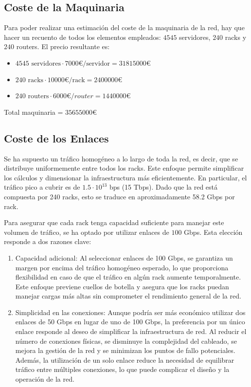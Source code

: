 \documentclass[%
    school=etsisi,%
    degree=61TI,%
]{upm-report}
\begin{document}
\subsection{Coste de la Maquinaria}
\label{subsec:coste-maquinaria}

Para poder realizar una estimación del coste de la maquinaria de la red, hay que hacer un recuento de todos los elementos empleados: $4545$ servidores, $240$ racks y $240$ routers. El precio resultante es:

\begin{itemize}
    \item $4545 \text{ servidores} \cdot 7000 €/\text{servidor} = 31815000 €$
    \item $240 \text{ racks} \cdot 10000 €/\text{rack} = 2400000 €$
    \item $240 \text{ routers} \cdot 6000 €/router = 1440000 €$
\end{itemize}

Total maquinaria = $35655000 €$

\subsection{Coste de los Enlaces}
\label{subsec:coste-enlaces}

Se ha supuesto un tráfico homogéneo a lo largo de toda la red, es decir, que se distribuye uniformemente entre todos los racks. Este enfoque permite simplificar los cálculos y dimensionar la infraestructura más eficientemente. En particular, el tráfico pico a cubrir es de $1.5 \cdot 10^{13}$ bps (15 Tbps). Dado que la red está compuesta por 240 racks, esto se traduce en aproximadamente 58.2 Gbps por rack.

Para asegurar que cada rack tenga capacidad suficiente para manejar este volumen de tráfico, se ha optado por utilizar enlaces de $100$ Gbps. Esta elección responde a dos razones clave:

\begin{enumerate}
    \item Capacidad adicional: Al seleccionar enlaces de 100 Gbps, se garantiza un margen por encima del tráfico homogéneo esperado, lo que proporciona flexibilidad en caso de que el tráfico en algún rack aumente temporalmente. Este enfoque previene cuellos de botella y asegura que los racks puedan manejar cargas más altas sin comprometer el rendimiento general de la red.
    \item Simplicidad en las conexiones: Aunque podría ser más económico utilizar dos enlaces de 50 Gbps en lugar de uno de 100 Gbps, la preferencia por un único enlace responde al deseo de simplificar la infraestructura de red. Al reducir el número de conexiones físicas, se disminuye la complejidad del cableado, se mejora la gestión de la red y se minimizan los puntos de fallo potenciales. Además, la utilización de un solo enlace reduce la necesidad de equilibrar tráfico entre múltiples conexiones, lo que puede complicar el diseño y la operación de la red.
\end{enumerate}
\end{document}
